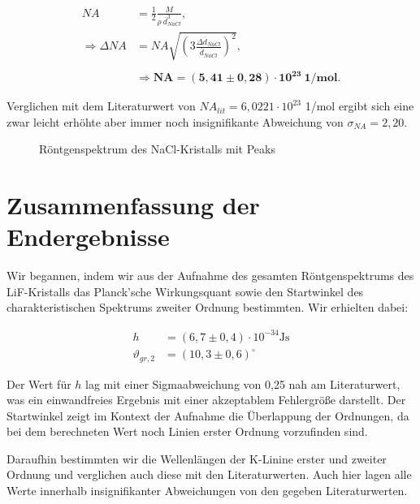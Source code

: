 \documentclass{article}
\begin{document}
\begin{equation}
    \begin{split}
        NA &= \frac{1}{2} \frac{M}{\rho \ \overline{d}_{NaCl}^3}, \\
        \Rightarrow \Delta NA &= NA \sqrt{\left( 3 \frac{\Delta \overline{d}_{NaCl}}{\overline{d}_{NaCl}} \right)^2}, \\ \\
        &\Rightarrow \bm{NA = (5,41 \pm 0,28) \cdot 10^{23}} \ \textbf{1/mol}.
    \end{split}
\end{equation}

Verglichen mit dem Literaturwert von $NA_{lit} = 6,0221 \cdot 10^{23}$ 1/mol ergibt sich eine zwar leicht erhöhte aber immer noch insignifikante Abweichung von $\sigma_{NA} = 2,20$.

\begin{figure}[!p]
    \centering
    \caption{Röntgenspektrum des NaCl-Kristalls mit Peaks}
    \label{fig:4_spek}
\end{figure}

\clearpage
\newpage
\section{Zusammenfassung der Endergebnisse}

Wir begannen, indem wir aus der Aufnahme des gesamten Röntgenspektrums des LiF-Kristalls das Planck'sche Wirkungsquant sowie den Startwinkel des charakteristischen Spektrums zweiter Ordnung bestimmten. Wir erhielten dabei:

\begin{equation}
    \begin{split}
        h &= (6,7 \pm 0,4) \cdot 10^{-34} \text{Js} \\
        \vartheta_{gr,2} &= (10,3 \pm 0,6)^\circ
    \end{split}
\end{equation}

Der Wert für $h$ lag mit einer Sigmaabweichung von 0,25 nah am Literaturwert, was ein einwandfreies Ergebnis mit einer akzeptablem Fehlergröße darstellt. Der Startwinkel zeigt im Kontext der Aufnahme die Überlappung der Ordnungen, da bei dem berechneten Wert noch Linien erster Ordnung vorzufinden sind.

Daraufhin bestimmten wir die Wellenlängen der K-Linine erster und zweiter Ordnung und verglichen auch diese mit den Literaturwerten. Auch hier lagen alle Werte innerhalb insignifikanter Abweichungen von den gegeben Literaturwerten. 
\end{document}
